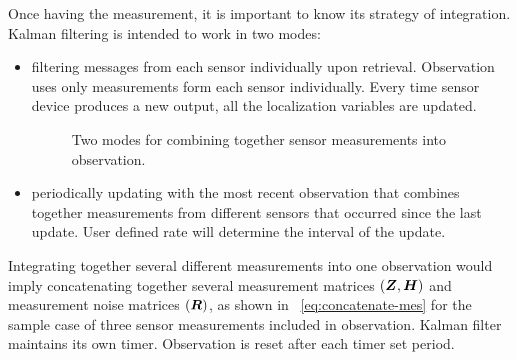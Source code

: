Once having the measurement, it is important to know its strategy of integration. Kalman filtering is intended to work in two modes:
\begin{itemize}
\item {}
filtering messages from each sensor individually upon retrieval. Observation uses only measurements form each sensor individually. Every time sensor device produces a new output, all the localization variables are updated.
\begin{figure}%
  \begin{center}
  \end{center}
  \caption{Two modes for combining together sensor measurements into observation.}
  \vspace{-10pt}
  \label{fig:ekf-modes}
\end{figure}
\item {}
periodically updating with the most recent observation that combines together measurements from different sensors that occurred since the last update. User defined rate will determine the interval of the update.
\end{itemize}
Integrating together several different measurements into one observation would imply concatenating together several measurement matrices $(\boldsymbol{Z}, \boldsymbol{H})$ and measurement noise matrices $(\boldsymbol{R})$, as shown in ~\ref{eq:concatenate-mes} for the sample case of three sensor measurements included in observation. Kalman filter maintains its own timer. Observation is reset after each timer set period.  
